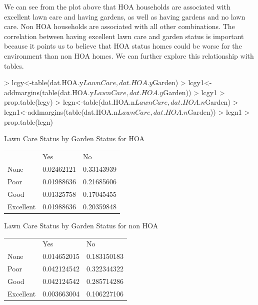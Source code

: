 \documentclass{article}
\begin{document}
\newline
We can see from the plot above that HOA households are associated with excellent lawn care and having gardens, as well as having gardens and no lawn care. Non HOA households are associated with all other combinations. The correlation between having excellent lawn care and garden status is important because it points us to believe that HOA status homes could be worse for the environment than non HOA homes. We can further explore this relationship with tables. 
\begin{Schunk}
\begin{Sinput}
> lcgy<-table(dat.HOA.y$LawnCare,dat.HOA.y$Garden)
> lcgy1<-addmargins(table(dat.HOA.y$LawnCare,dat.HOA.y$Garden))
> lcgy1
> prop.table(lcgy)
> lcgn<-table(dat.HOA.n$LawnCare,dat.HOA.n$Garden)
> lcgn1<-addmargins(table(dat.HOA.n$LawnCare,dat.HOA.n$Garden))
> lcgn1
> prop.table(lcgn)
\end{Sinput}
\end{Schunk}

\begin{center} Lawn Care Status by Garden Status for HOA \end{center}
\begin{table}[H]
\begin{tabular}{lll}
          & Yes        & No         \\
None      & 0.02462121 & 0.33143939 \\
Poor      & 0.01988636 & 0.21685606 \\
Good      & 0.01325758 & 0.17045455 \\
Excellent & 0.01988636 & 0.20359848
\end{tabular}
\end{table}

\begin{center} Lawn Care Status by Garden Status for non HOA \end{center}
\begin{table}[H]
\begin{tabular}{lll}
          & Yes         & No          \\
None      & 0.014652015 & 0.183150183 \\
Poor      & 0.042124542 & 0.322344322 \\
Good      & 0.042124542 & 0.285714286 \\
Excellent & 0.003663004 & 0.106227106
\end{tabular}
\end{table}
\end{document}
